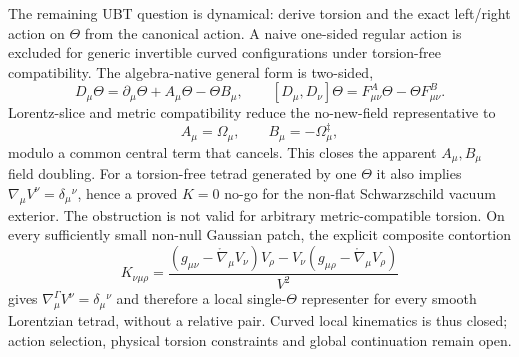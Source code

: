 The remaining UBT question is dynamical: derive torsion and the exact
left/right action on $\Theta$ from the canonical action.  A naive one-sided
regular action is excluded for generic invertible curved configurations under
torsion-free compatibility.  The algebra-native general form is two-sided,
\[
 D_\mu\Theta=\partial_\mu\Theta+A_\mu\Theta-\Theta B_\mu,
 \qquad
 [D_\mu,D_\nu]\Theta
 =F^A_{\mu\nu}\Theta-\Theta F^B_{\mu\nu}.
\]
Lorentz-slice and metric compatibility reduce the no-new-field representative
to
\[
 A_\mu=\Omega_\mu,\qquad B_\mu=-\Omega_\mu^\ddagger,
\]
modulo a common central term that cancels.  This closes the apparent
$A_\mu,B_\mu$ field doubling.  For a torsion-free tetrad generated by one
$\Theta$ it also implies
$\nabla_\mu V^\nu=\delta_\mu{}^\nu$, hence a proved $K=0$ no-go for the
non-flat Schwarzschild vacuum exterior.  The obstruction is not valid for
arbitrary metric-compatible torsion.  On every sufficiently small non-null
Gaussian patch, the explicit composite contortion
\[
 K_{\nu\mu\rho}
 =\frac{(g_{\mu\nu}-\mathring\nabla_\mu V_\nu)V_\rho
        -V_\nu(g_{\mu\rho}-\mathring\nabla_\mu V_\rho)}{V^2}
\]
gives $\nabla^{\Gamma}_\mu V^\nu=\delta_\mu{}^\nu$ and therefore a local
single-$\Theta$ representer for every smooth Lorentzian tetrad, without a
relative pair.  Curved local kinematics is thus closed; action selection,
physical torsion constraints and global continuation remain open.
